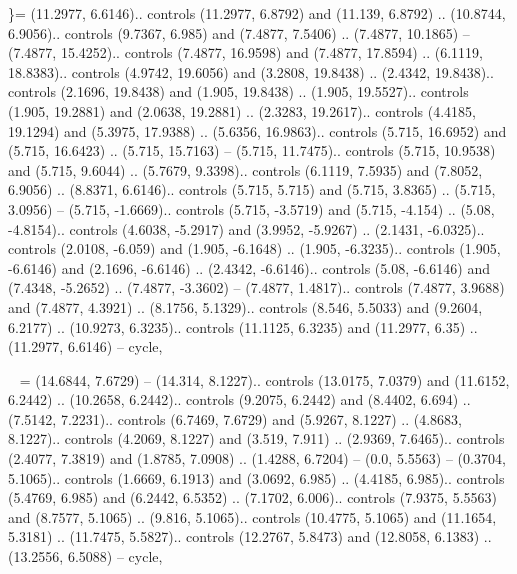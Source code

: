 \}= {(11.2977, 6.6146).. controls (11.2977, 6.8792) and (11.139, 6.8792) .. (10.8744, 6.9056).. controls (9.7367, 6.985) and (7.4877, 7.5406) .. (7.4877, 10.1865) -- (7.4877, 15.4252).. controls (7.4877, 16.9598) and (7.4877, 17.8594) .. (6.1119, 18.8383).. controls (4.9742, 19.6056) and (3.2808, 19.8438) .. (2.4342, 19.8438).. controls (2.1696, 19.8438) and (1.905, 19.8438) .. (1.905, 19.5527).. controls (1.905, 19.2881) and (2.0638, 19.2881) .. (2.3283, 19.2617).. controls (4.4185, 19.1294) and (5.3975, 17.9388) .. (5.6356, 16.9863).. controls (5.715, 16.6952) and (5.715, 16.6423) .. (5.715, 15.7163) -- (5.715, 11.7475).. controls (5.715, 10.9538) and (5.715, 9.6044) .. (5.7679, 9.3398).. controls (6.1119, 7.5935) and (7.8052, 6.9056) .. (8.8371, 6.6146).. controls (5.715, 5.715) and (5.715, 3.8365) .. (5.715, 3.0956) -- (5.715, -1.6669).. controls (5.715, -3.5719) and (5.715, -4.154) .. (5.08, -4.8154).. controls (4.6038, -5.2917) and (3.9952, -5.9267) .. (2.1431, -6.0325).. controls (2.0108, -6.059) and (1.905, -6.1648) .. (1.905, -6.3235).. controls (1.905, -6.6146) and (2.1696, -6.6146) .. (2.4342, -6.6146).. controls (5.08, -6.6146) and (7.4348, -5.2652) .. (7.4877, -3.3602) -- (7.4877, 1.4817).. controls (7.4877, 3.9688) and (7.4877, 4.3921) .. (8.1756, 5.1329).. controls (8.546, 5.5033) and (9.2604, 6.2177) .. (10.9273, 6.3235).. controls (11.1125, 6.3235) and (11.2977, 6.35) .. (11.2977, 6.6146) -- cycle},

~ = {(14.6844, 7.6729) -- (14.314, 8.1227).. controls (13.0175, 7.0379) and (11.6152, 6.2442) .. (10.2658, 6.2442).. controls (9.2075, 6.2442) and (8.4402, 6.694) .. (7.5142, 7.2231).. controls (6.7469, 7.6729) and (5.9267, 8.1227) .. (4.8683, 8.1227).. controls (4.2069, 8.1227) and (3.519, 7.911) .. (2.9369, 7.6465).. controls (2.4077, 7.3819) and (1.8785, 7.0908) .. (1.4288, 6.7204) -- (0.0, 5.5563) -- (0.3704, 5.1065).. controls (1.6669, 6.1913) and (3.0692, 6.985) .. (4.4185, 6.985).. controls (5.4769, 6.985) and (6.2442, 6.5352) .. (7.1702, 6.006).. controls (7.9375, 5.5563) and (8.7577, 5.1065) .. (9.816, 5.1065).. controls (10.4775, 5.1065) and (11.1654, 5.3181) .. (11.7475, 5.5827).. controls (12.2767, 5.8473) and (12.8058, 6.1383) .. (13.2556, 6.5088) -- cycle},
